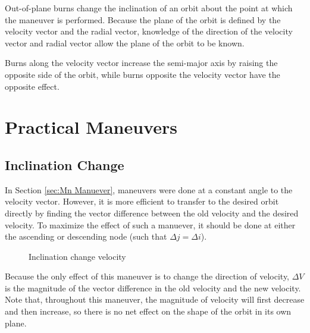 \documentclass{article}
\begin{document}
Out-of-plane burns change the inclination of an orbit about the point at which the maneuver is performed. Because the plane of the orbit is defined by the velocity vector and the radial vector, knowledge of the direction of the velocity vector and radial vector allow the plane of the orbit to be known.

Burns along the velocity vector increase the semi-major axis by raising the opposite side of the orbit, while burns opposite the velocity vector have the opposite effect.

\pagebreak
\section{Practical Maneuvers}

\bigskip\bigskip
\subsection{Inclination Change}

In Section \ref{sec:Mn Manuever}, maneuvers were done at a constant angle to the velocity vector. However, it is more efficient to transfer to the desired orbit directly by finding the vector difference between the old velocity and the desired velocity. To maximize the effect of such a manuever, it should be done at either the ascending or descending node (such that $\Delta j=\Delta i$).

\begin{figure}[H]
    \centering
    \caption{Inclination change velocity}\label{fig:dV Triangle Inclination Chage}
\end{figure}

Because the only effect of this maneuver is to change the direction of velocity, $\Delta V$ is the magnitude of the vector difference in the old velocity and the new velocity. Note that, throughout this maneuver, the magnitude of velocity will first decrease and then increase, so there is no net effect on the shape of the orbit in its own plane.
\end{document}
